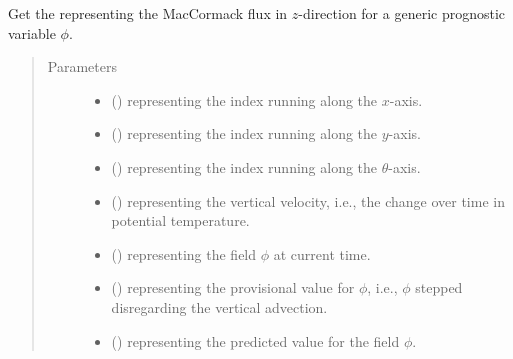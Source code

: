 \documentclass[letterpaper,10pt,english]{sphinxmanual}
\begin{document}
\begin{fulllineitems}

\begin{fulllineitems}
\label{\detokenize{api:dycore.flux_isentropic_maccormack.FluxIsentropicMacCormack._get_maccormack_flux_z}}
Get the  representing the MacCormack flux in \(z\)-direction for a
generic prognostic variable \(\phi\).
\begin{quote}\begin{description}
\item[{Parameters}] \leavevmode\begin{itemize}
\item {} 
 () \textendash{}  representing the index running along the \(x\)-axis.

\item {} 
 () \textendash{}  representing the index running along the \(y\)-axis.

\item {} 
 () \textendash{}  representing the index running along the \(\theta\)-axis.

\item {} 
 () \textendash{}  representing the vertical velocity,
i.e., the change over time in potential temperature.

\item {} 
 () \textendash{}  representing the field \(\phi\) at current time.

\item {} 
 () \textendash{}  representing the provisional value for \(\phi\),
i.e., \(\phi\) stepped disregarding the vertical advection.

\item {} 
 () \textendash{}  representing the predicted value for the field \(\phi\).


\end{itemize}
\end{description}
\end{quote}
\end{fulllineitems}
\end{fulllineitems}
\end{document}

